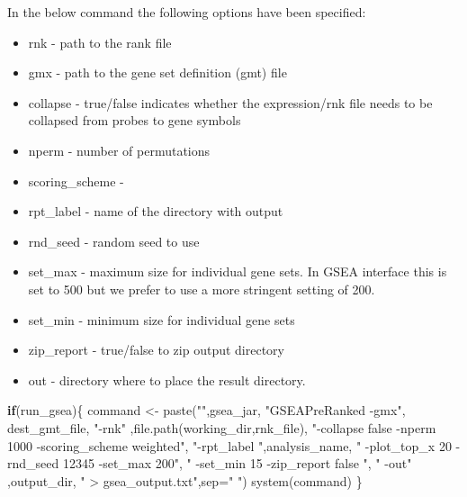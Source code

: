 \documentclass[
]{book}
\newenvironment{Shaded}{\begin{snugshade}}{\end{snugshade}}
\newcommand{\AttributeTok}[1]{\textcolor[rgb]{0.77,0.63,0.00}{#1}}
\newcommand{\ControlFlowTok}[1]{\textcolor[rgb]{0.13,0.29,0.53}{\textbf{#1}}}
\newcommand{\FunctionTok}[1]{\textcolor[rgb]{0.00,0.00,0.00}{#1}}
\newcommand{\NormalTok}[1]{#1}
\newcommand{\OtherTok}[1]{\textcolor[rgb]{0.56,0.35,0.01}{#1}}
\newcommand{\StringTok}[1]{\textcolor[rgb]{0.31,0.60,0.02}{#1}}
\providecommand{\tightlist}{%
  \setlength{\itemsep}{0pt}\setlength{\parskip}{0pt}}
\begin{document}
In the below command the following options have been specified:

\begin{itemize}
\tightlist
\item
  rnk - path to the rank file
\item
  gmx - path to the gene set definition (gmt) file
\item
  collapse - true/false indicates whether the expression/rnk file needs to be collapsed from probes to gene symbols
\item
  nperm - number of permutations
\item
  scoring\_scheme -
\item
  rpt\_label - name of the directory with output
\item
  rnd\_seed - random seed to use
\item
  set\_max - maximum size for individual gene sets. In GSEA interface this is set to 500 but we prefer to use a more stringent setting of 200.
\item
  set\_min - minimum size for individual gene sets
\item
  zip\_report - true/false to zip output directory
\item
  out - directory where to place the result directory.
\end{itemize}

\begin{Shaded}
\begin{Highlighting}[]
\ControlFlowTok{if}\NormalTok{(run\_gsea)\{}
\NormalTok{  command }\OtherTok{\textless{}{-}} \FunctionTok{paste}\NormalTok{(}\StringTok{""}\NormalTok{,gsea\_jar,  }
                   \StringTok{"GSEAPreRanked {-}gmx"}\NormalTok{, dest\_gmt\_file, }
                   \StringTok{"{-}rnk"}\NormalTok{ ,}\FunctionTok{file.path}\NormalTok{(working\_dir,rnk\_file), }
                   \StringTok{"{-}collapse false {-}nperm 1000 {-}scoring\_scheme weighted"}\NormalTok{, }
                   \StringTok{"{-}rpt\_label "}\NormalTok{,analysis\_name,}
                   \StringTok{"  {-}plot\_top\_x 20 {-}rnd\_seed 12345  {-}set\_max 200"}\NormalTok{,  }
                   \StringTok{" {-}set\_min 15 {-}zip\_report false "}\NormalTok{,}
                   \StringTok{" {-}out"}\NormalTok{ ,output\_dir, }
                   \StringTok{" \textgreater{} gsea\_output.txt"}\NormalTok{,}\AttributeTok{sep=}\StringTok{" "}\NormalTok{)}
  \FunctionTok{system}\NormalTok{(command)}
\NormalTok{\}}
\end{Highlighting}
\end{Shaded}
\end{document}
